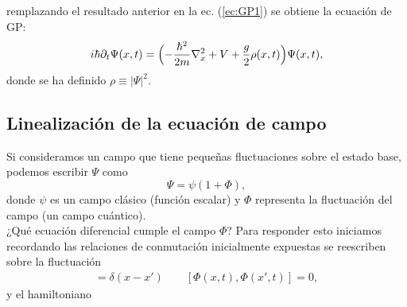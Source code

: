 remplazando el resultado anterior en la ec. (\ref{ec:GP1}) se obtiene la ecuaci\'{o}n de GP:
\begin{equation}\label{ec:GP2}
i\hbar\partial_t \Psi(x,t)=\Bigl(-\frac{\hbar^2}{2m}\nabla_x^2 + V+\frac{g}{2}\rho(x,t)\Bigr)\Psi(x,t),
\end{equation}
donde se ha definido $\rho\equiv|\Psi|^2$.\\

\subsection{Linealizaci\'{o}n de la ecuaci\'{o}n de campo}\label{Lcampo}
Si consideramos un campo que tiene peque\~{n}as fluctuaciones sobre el estado base, podemos escribir $\Psi$ como
\begin{equation}
\Psi=\psi(1+\Phi),
\end{equation}
donde $\psi$ es un campo cl\'{a}sico (funci\'{o}n escalar) y $\Phi$ representa la fluctuaci\'{o}n del campo (un campo cu\'{a}ntico).\\

¿Qu\'{e} ecuaci\'{o}n diferencial cumple el campo $\Phi$? Para responder esto iniciamos recordando las relaciones de conmutaci\'{o}n inicialmente expuestas se reescriben sobre la fluctuaci\'{o}n
\begin{align}
[\Phi(x,t),\Phi^{\dagger}(x',t)]=\delta(x-x') \qquad [\Phi(x,t),\Phi(x',t)]=0,
\end{align}
y el hamiltoniano

